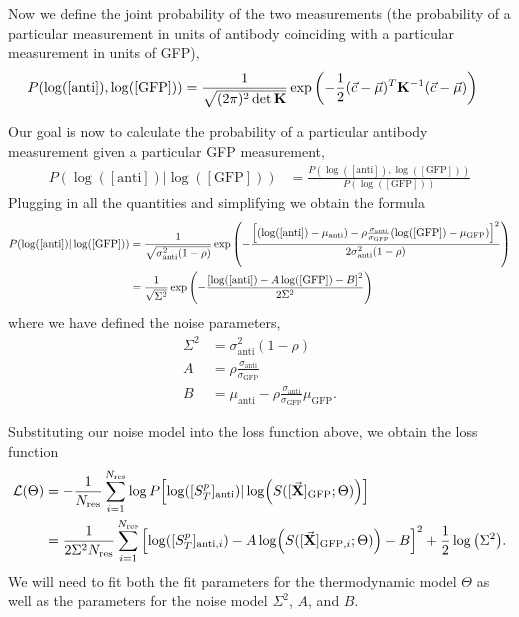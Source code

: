 \documentclass[aps,onecolumn,superscriptaddress,notitlepage]{revtex4-1}
\newcommand{\sigmaGFP}{\sigma_{\mathrm{GFP}}}
\newcommand{\sigmaanti}{\sigma_{\mathrm{anti}}}
\newcommand{\muGFP}{\mu_{\mathrm{GFP}}}
\newcommand{\muanti}{\mu_{\mathrm{anti}}}
\newcommand{\lGFP}{\log([\mathrm{GFP}])}
\newcommand{\lanti}{\log([\mathrm{anti}])}
\newcommand{\vbX}{\vec{\mathbf{X}}}
\begin{document}
Now we define the joint probability of the two measurements (the probability of a particular measurement in units of antibody coinciding with a particular measurement in units of GFP),
\begin{align}
P(\lanti, \lGFP) &= \frac{1}{\sqrt{(2\pi)^2 \det \mathbf{K}}}\exp\qty(-\frac{1}{2}(\vec{c}-\vec{\mu})^T \mathbf{K}^{-1}(\vec{c}-\vec{\mu}))
\end{align}

Our goal is now to calculate the probability of a particular antibody measurement given a particular GFP measurement,
\begin{align}
P(\lanti | \lGFP) &= \frac{P(\lanti, \lGFP)}{P(\lGFP)}
\end{align}
Plugging in all the quantities and simplifying we obtain the formula
\begin{align}
P(\lanti | \lGFP) &= \frac{1}{\sqrt{\sigmaanti^2(1-\rho)}}\exp\qty(-\frac{\qty[(\lanti-\muanti) - \rho \frac{\sigmaanti}{\sigmaGFP}(\lGFP-\muGFP)]^2}{2 \sigmaanti^2(1-\rho)})\\
&= \frac{1}{\sqrt{\Sigma^2}}\exp\qty(-\frac{\qty[\lanti -A\lGFP - B]^2}{2 \Sigma^2})
\end{align}
where we have defined the noise parameters,
\begin{align}
\Sigma^2 &= \sigmaanti^2(1-\rho)\\
A &=  \rho \frac{\sigmaanti}{\sigmaGFP}\\
B &= \muanti - \rho \frac{\sigmaanti}{\sigmaGFP}\muGFP.
\end{align}

 Substituting our noise model into the loss function above, we obtain the loss function
\begin{align}
\mathcal{L}(\Theta) &= -\frac{1}{N_{\mathrm{res}}}\sum_{i=1}^{N_{\mathrm{res}}}\log P\qty[\log([S_T^p]_{\mathrm{anti}}) | \log(S([\vbX]_{\mathrm{GFP}};\Theta))]\\
&= \frac{1}{2\Sigma^2N_{\mathrm{res}}}\sum_{i=1}^{N_{\mathrm{res}}}\qty[\log([S_T^p]_{\mathrm{anti}, i}) - A \log(S([\vbX]_{\mathrm{GFP}, i};\Theta)) - B]^2 + \frac{1}{2}\log\qty(\Sigma^2).
\end{align}
We will need to fit both the fit parameters for the thermodynamic model $\Theta$ as well as the parameters for the noise model $\Sigma^2$, $A$, and $B$.
\end{document}
